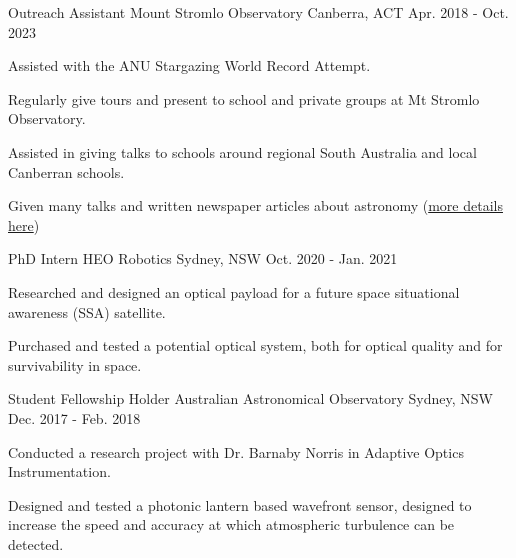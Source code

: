 \begin{cventries}
  \cventry
    {Outreach Assistant} %
    {Mount Stromlo Observatory} %
    {Canberra, ACT} %
    {Apr. 2018 - Oct. 2023} %
    {
      \begin{cvitems} %
        \item {Assisted with the ANU Stargazing World Record Attempt.}
        \item {Regularly give tours and present to school and private groups at Mt Stromlo Observatory.}
        \item {Assisted in giving talks to schools around regional South Australia and local Canberran schools.}
        \item {Given many talks and written newspaper articles about astronomy (\href{https://www.mso.anu.edu.au/~jhansen/\#outreach}{more details here})}
      \end{cvitems}
    }
    

  \cventry
    {PhD Intern} %
    {HEO Robotics} %
    {Sydney, NSW} %
    {Oct. 2020 - Jan. 2021} %
    {
      \begin{cvitems} %
        \item {Researched and designed an optical payload for a future space situational awareness (SSA) satellite.}
        \item {Purchased and tested a potential optical system, both for optical quality and for survivability in space.}
      \end{cvitems}
    }

  \cventry
    {Student Fellowship Holder} %
    {Australian Astronomical Observatory} %
    {Sydney, NSW} %
    {Dec. 2017 - Feb. 2018} %
    {
      \begin{cvitems} %
        \item {Conducted a research project with Dr. Barnaby Norris in Adaptive Optics Instrumentation.}
        \item {Designed and tested a photonic lantern based wavefront sensor, designed to increase the speed and accuracy at which atmospheric turbulence can be detected.}
      \end{cvitems}
    }


\end{cventries}
